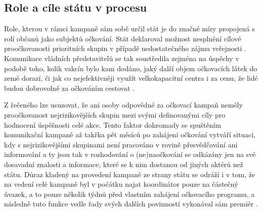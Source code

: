 \subsection*{Role a cíle státu v procesu}

Role, kterou v rámci kampaně sám sobě určil stát je do značné míry propojená s rolí občanů jako subjektů očkování.
%
Stát deklaroval možnost nesplnění cílové proočkovanosti prioritních skupin v případě nedostatečného zájmu veřejnosti \cite{kdoprvni}. Komunikace vládních představitelů se tak soustředila zejména na úspěchy v podobě toho, kolik vakcín bylo kam dodáno, jaký další objem očkovacích látek do země dorazí, či jak co nejefektivněji využít velkokapacitní centra i za cenu, že lidé budou dobrovolně za očkováním cestovat \cite{babis_echo}.

Z řečeného lze usuzovat, že ani osoby odpovědné za očkovací kampaň neměly proočkovanost nejrizikovějších skupin mezi svými definovanými cíly pro hodnocení úspěšnosti celé akce. Tento faktor dohromady 
se spuštěním komunikační kampaně až takřka pět měsíců po zahájení očkování \cite{logoc_naruby,logoc_zpozdeni} vytváří situaci, kdy s nejrizikovějšími skupinami není pracováno v rovině přesvědčování ani informování a ty jsou tak v rozhodování o (ne)naočkování se odkázány jen na své dosavadní znalosti a informace, které se k nim dostanou od jiných aktérů než státu. Důraz kladený na provedení kampaně ze strany státu se odráží i v tom, že na vedení celé kampaně byl v počátku najat koordinátor pouze na částečný úvazek, a to pouze několik týdnů před vlastním zahájení očkovacího programu, a následně tuto funkce vedle řady svých dalších povinností vykonával sám premiér \cite{ocko_blahuta,babis_koordinator}. %




